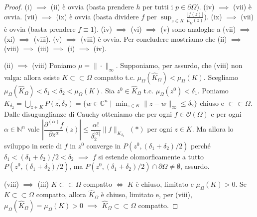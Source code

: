 \begin{proof}
  (i) $\implies$ (ii) è ovvia (basta prendere $h$ per tutti i $p \in \partial\Omega$). (iv) $\implies$ (vii) è ovvia. (vii) $\implies$ (ix) è ovvia (basta dividere $f$ per $\displaystyle \sup_{z \in K} \frac{|f(z)|}{\mu_\Omega(z)}$). (ix) $\implies$ (vii) è ovvia (basta prendere $f \equiv 1$). (iv) $\implies$ (vi) $\implies$ (v) sono analoghe a (vii) $\implies$ (xi) $\implies$ (viii).
  (v) $\implies$ (viii) è ovvia. Per concludere mostriamo che (ii) $\implies$ (viii) $\implies$ (iii) $\implies$ (i) $\implies$ (iv).

  (ii) $\implies$ (viii) Poniamo $\mu=\|\cdot\|_{\infty}$. Supponiamo, per assurdo, che (viii) non valga: allora esiste $K \subset\subset \Omega$ compatto t.c. $\mu_{\Omega}(\hat{K}_\Omega)<\mu_\Omega(K)$. Scegliamo $\mu_\Omega(\hat{K}_\Omega)< \delta_1<\delta_2<\mu_\Omega(K)$.
  Sia $z^0 \in \hat{K}_\Omega$ t.c. $\mu_\Omega(z^0)<\delta_1$.
  Poniamo $\displaystyle K_{\delta_2}=\bigcup_{z \in K} \overline{P(z, \delta_2)}=\{w \in \mathbb{C}^n \mid \min_{z \in K} \|z-w\|_\infty \le \delta_2\}$ chiuso e $\subset\subset \Omega$.
  Dalle disuguaglianze di Cauchy otteniamo che per ogni $f \in \mathcal{O}(\Omega)$ e per ogni $\alpha \in \mathbb{N}^n$ vale $\left|\dfrac{\partial^{(\alpha)}f}{\partial z^\alpha}(z)\right| \le \dfrac{\alpha!}{\delta_2^{|\alpha|}}\|f\|_{K_{\delta_2}}$ $(*)$ per ogni $z \in K$.
  Ma allora lo sviluppo in serie di $f$ in $z^0$ converge in $P(z^0, (\delta_1+\delta_2)/2)$ perché $\delta_1<(\delta_1+\delta_2)/2<\delta_2$ $\implies$ $f$ si estende olomorficamente a tutto $P(z^0, (\delta_1+\delta_2)/2)$, ma $P(z^0, (\delta_1+\delta_2)/2) \cap \partial\Omega\not=\emptyset$, assurdo.

  (viii) $\implies$ (iii) $K \subset\subset \Omega$ compatto $\iff$ $K$ è chiuso, limitato e $\mu_\Omega(K)>0$. Se $K \subset\subset \Omega$ compatto, allora $\hat{K}_\Omega$ è chiuso, limitato e, per (viii), $\mu_\Omega(\hat{K}_\Omega)=\mu_\Omega(K)>0$ $\implies$ $\hat{K}_\Omega \subset\subset \Omega$ compatto.


\end{proof}
